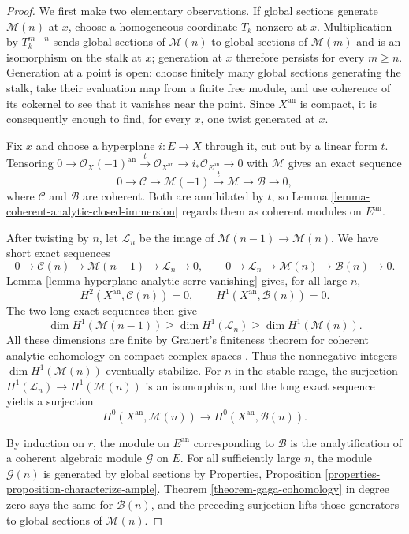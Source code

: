 \begin{proof}
We first make two elementary observations. If global sections generate
$\mathcal M(n)$ at $x$, choose a homogeneous coordinate $T_k$ nonzero at
$x$. Multiplication by $T_k^{m-n}$ sends global sections of $\mathcal M(n)$
to global sections of $\mathcal M(m)$ and is an isomorphism on the stalk at
$x$; generation at $x$ therefore persists for every $m\geq n$. Generation
at a point is open: choose finitely many global sections generating the
stalk, take their evaluation map from a finite free module, and use
coherence of its cokernel to see that it vanishes near the point. Since
$X^{\mathrm{an}}$ is compact, it is consequently enough to find, for every
$x$, one twist generated at $x$.

Fix $x$ and choose a hyperplane $i:E\to X$ through it, cut out by a linear
form $t$. Tensoring
$0\to\mathcal O_X(-1)^{\mathrm{an}}\xrightarrow{t}
\mathcal O_{X^{\mathrm{an}}}\to i_*\mathcal O_{E^{\mathrm{an}}}\to0$
with $\mathcal M$ gives an exact sequence
$$
0\longrightarrow\mathcal C\longrightarrow\mathcal M(-1)
\xrightarrow{t}\mathcal M\longrightarrow\mathcal B\longrightarrow0,
$$
where $\mathcal C$ and $\mathcal B$ are coherent. Both are annihilated by
$t$, so Lemma \ref{lemma-coherent-analytic-closed-immersion} regards them
as coherent modules on $E^{\mathrm{an}}$.

After twisting by $n$, let $\mathcal L_n$ be the image of
$\mathcal M(n-1)\to\mathcal M(n)$. We have short exact sequences
$$
0\to\mathcal C(n)\to\mathcal M(n-1)\to\mathcal L_n\to0,
\qquad
0\to\mathcal L_n\to\mathcal M(n)\to\mathcal B(n)\to0.
$$
Lemma \ref{lemma-hyperplane-analytic-serre-vanishing} gives, for all large
$n$,
$$
H^2(X^{\mathrm{an}},\mathcal C(n))=0,
\qquad
H^1(X^{\mathrm{an}},\mathcal B(n))=0.
$$
The two long exact sequences then give
$$
\dim H^1(\mathcal M(n-1))
\geq\dim H^1(\mathcal L_n)
\geq\dim H^1(\mathcal M(n)).
$$
All these dimensions are finite by Grauert's finiteness theorem for coherent
analytic cohomology on compact complex spaces
\cite[Hauptsatz I, p. 57]{Grauert-direct-image}.
Thus the nonnegative integers $\dim H^1(\mathcal M(n))$ eventually
stabilize. For $n$ in the stable range, the surjection
$H^1(\mathcal L_n)\to H^1(\mathcal M(n))$ is an isomorphism, and the long
exact sequence yields a surjection
$$
H^0(X^{\mathrm{an}},\mathcal M(n))
\longrightarrow H^0(X^{\mathrm{an}},\mathcal B(n)).
$$

By induction on $r$, the module on $E^{\mathrm{an}}$ corresponding to
$\mathcal B$ is the analytification of a coherent algebraic module
$\mathcal G$ on $E$. For all sufficiently large $n$, the module
$\mathcal G(n)$ is generated by global sections by Properties, Proposition
\ref{properties-proposition-characterize-ample}. Theorem
\ref{theorem-gaga-cohomology} in degree zero says the same for
$\mathcal B(n)$, and the preceding surjection lifts those generators to
global sections of $\mathcal M(n)$.


\end{proof}
